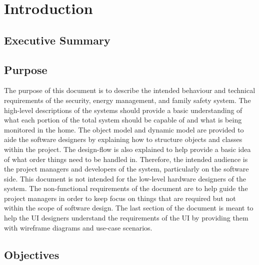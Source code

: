 \documentclass{report}
\begin{document}

\tableofcontents
\listoffigures

\chapter{Introduction}
\section{Executive Summary}

\section{Purpose}
The purpose of this document is to describe the intended behaviour and
technical requirements of the security, energy management, and family safety
system. The high-level descriptions of the systems should provide a basic understanding
of what each portion of the total system should be capable of and what is being
monitored in the home. The object model and dynamic model are provided to
aide the software designers by explaining how to structure objects and classes
within the project. The design-flow is also explained to help provide a basic idea
of what order things need to be handled in.
Therefore, the intended audience is the project managers and developers of the 
system, particularly on the software side. This document is not intended for the
low-level hardware designers of the system. The non-functional requirements of the 
document are to help guide the project managers in order to keep focus on things that 
are required but not within the scope of software design. The last section of the
document is meant to help the UI designers understand the requirements of the UI
by providing them with wireframe diagrams and use-case scenarios.

\section{Objectives}

\end{document}
